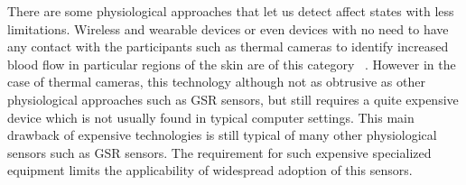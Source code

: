 There are some physiological approaches that let us detect affect states with less limitations. Wireless and wearable devices or even devices with no need to have any contact with the participants such as thermal cameras to identify increased blood flow in particular regions of the skin are of this category ~\cite{puri2005stresscam}. However in the case of thermal cameras, this technology although not as obtrusive as other physiological approaches such as GSR sensors, but still requires a quite expensive device which is not usually found in typical computer settings. This main drawback of expensive technologies is still typical of many other physiological sensors such as GSR sensors. The requirement for such expensive specialized equipment limits the applicability of widespread adoption of this sensors. 
